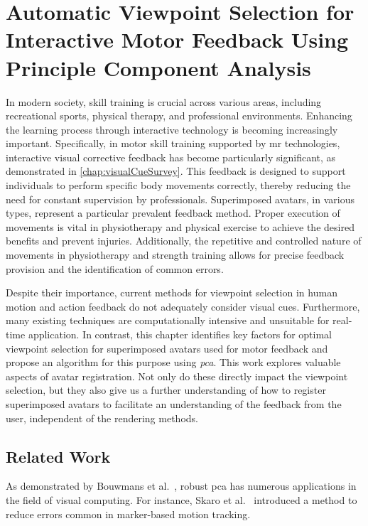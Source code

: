 
\chapter{Automatic Viewpoint Selection for Interactive Motor Feedback Using Principle Component Analysis\label{chap:viewpoint}}
In modern society, skill training is crucial across various areas, including recreational sports, physical therapy, and professional environments. Enhancing the learning process through interactive technology is becoming increasingly important. Specifically, in motor skill training supported by \acrshort{mr} technologies, interactive visual corrective feedback has become particularly significant, as demonstrated in \autoref{chap:visualCueSurvey}. This feedback is designed to support individuals to perform specific body movements correctly, thereby reducing the need for constant supervision by professionals. Superimposed avatars, in various types, represent a particular prevalent feedback method. Proper execution of movements is vital in physiotherapy and physical exercise to achieve the desired benefits and prevent injuries. Additionally, the repetitive and controlled nature of movements in physiotherapy and strength training allows for precise feedback provision and the identification of common errors.

Despite their importance, current methods for viewpoint selection in human motion and action feedback do not adequately consider visual cues. Furthermore, many existing techniques are computationally intensive and unsuitable for real-time application. In contrast, this chapter identifies key factors for optimal viewpoint selection for superimposed avatars used for motor feedback and propose an algorithm for this purpose using \emph{\acrshort{pca}}. This work explores valuable aspects of avatar registration. Not only do these directly impact the viewpoint selection, but they also give us a further understanding of how to register superimposed avatars to facilitate an understanding of the feedback from the user, independent of the rendering methods.

\section{Related Work \label{sec:relView}}
As demonstrated by Bouwmans et al.~\cite{bouwmans2018arpca}, robust \acrshort{pca} has numerous applications in the field of visual computing. For instance, Skaro et al.~\cite{skaro2021knac} introduced a method to reduce errors common in marker-based motion tracking.


